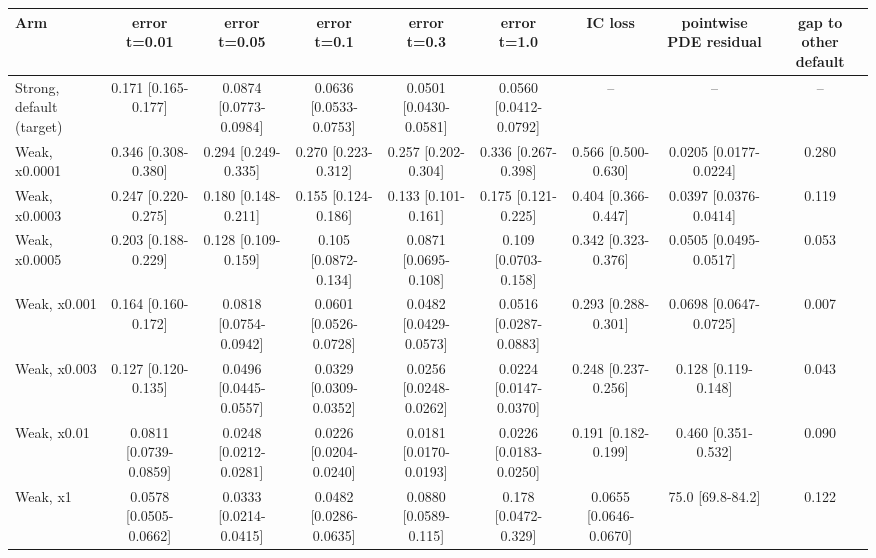 \begin{tabular}{lcccccccc}
\toprule
Arm & error t=0.01 & error t=0.05 & error t=0.1 & error t=0.3 & error t=1.0 & IC loss & pointwise PDE residual & gap to other default \\
\midrule
Strong, default (target) & 0.171 {\scriptsize[0.165-0.177]} & 0.0874 {\scriptsize[0.0773-0.0984]} & 0.0636 {\scriptsize[0.0533-0.0753]} & 0.0501 {\scriptsize[0.0430-0.0581]} & 0.0560 {\scriptsize[0.0412-0.0792]} & -- & -- & -- \\
Weak, x0.0001 & 0.346 {\scriptsize[0.308-0.380]} & 0.294 {\scriptsize[0.249-0.335]} & 0.270 {\scriptsize[0.223-0.312]} & 0.257 {\scriptsize[0.202-0.304]} & 0.336 {\scriptsize[0.267-0.398]} & 0.566 {\scriptsize[0.500-0.630]} & 0.0205 {\scriptsize[0.0177-0.0224]} & 0.280 \\
Weak, x0.0003 & 0.247 {\scriptsize[0.220-0.275]} & 0.180 {\scriptsize[0.148-0.211]} & 0.155 {\scriptsize[0.124-0.186]} & 0.133 {\scriptsize[0.101-0.161]} & 0.175 {\scriptsize[0.121-0.225]} & 0.404 {\scriptsize[0.366-0.447]} & 0.0397 {\scriptsize[0.0376-0.0414]} & 0.119 \\
Weak, x0.0005 & 0.203 {\scriptsize[0.188-0.229]} & 0.128 {\scriptsize[0.109-0.159]} & 0.105 {\scriptsize[0.0872-0.134]} & 0.0871 {\scriptsize[0.0695-0.108]} & 0.109 {\scriptsize[0.0703-0.158]} & 0.342 {\scriptsize[0.323-0.376]} & 0.0505 {\scriptsize[0.0495-0.0517]} & 0.053 \\
Weak, x0.001 & 0.164 {\scriptsize[0.160-0.172]} & 0.0818 {\scriptsize[0.0754-0.0942]} & 0.0601 {\scriptsize[0.0526-0.0728]} & 0.0482 {\scriptsize[0.0429-0.0573]} & 0.0516 {\scriptsize[0.0287-0.0883]} & 0.293 {\scriptsize[0.288-0.301]} & 0.0698 {\scriptsize[0.0647-0.0725]} & 0.007 \\
Weak, x0.003 & 0.127 {\scriptsize[0.120-0.135]} & 0.0496 {\scriptsize[0.0445-0.0557]} & 0.0329 {\scriptsize[0.0309-0.0352]} & 0.0256 {\scriptsize[0.0248-0.0262]} & 0.0224 {\scriptsize[0.0147-0.0370]} & 0.248 {\scriptsize[0.237-0.256]} & 0.128 {\scriptsize[0.119-0.148]} & 0.043 \\
Weak, x0.01 & 0.0811 {\scriptsize[0.0739-0.0859]} & 0.0248 {\scriptsize[0.0212-0.0281]} & 0.0226 {\scriptsize[0.0204-0.0240]} & 0.0181 {\scriptsize[0.0170-0.0193]} & 0.0226 {\scriptsize[0.0183-0.0250]} & 0.191 {\scriptsize[0.182-0.199]} & 0.460 {\scriptsize[0.351-0.532]} & 0.090 \\
Weak, x1 & 0.0578 {\scriptsize[0.0505-0.0662]} & 0.0333 {\scriptsize[0.0214-0.0415]} & 0.0482 {\scriptsize[0.0286-0.0635]} & 0.0880 {\scriptsize[0.0589-0.115]} & 0.178 {\scriptsize[0.0472-0.329]} & 0.0655 {\scriptsize[0.0646-0.0670]} & 75.0 {\scriptsize[69.8-84.2]} & 0.122 \\
\bottomrule
\end{tabular}

